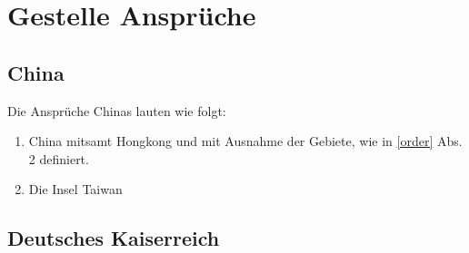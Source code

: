 \documentclass{article}
\begin{document}
\section{Gestelle Ansprüche}

\subsection{China}
Die Ansprüche Chinas lauten wie folgt:
\begin{enumerate}
    \item China mitsamt Hongkong und mit Ausnahme der Gebiete, wie in \ref{order} Abs. 2 definiert.
    \item Die Insel Taiwan
\end{enumerate}

\subsection{Deutsches Kaiserreich}\label{german}
\end{document}
